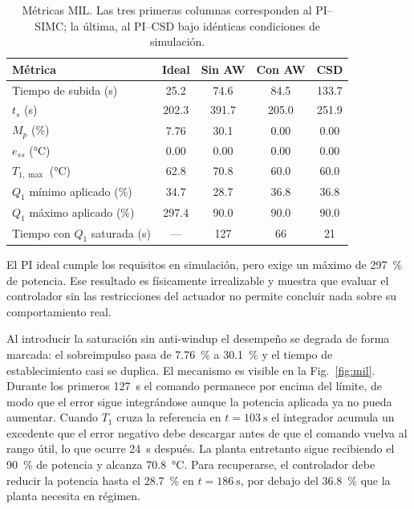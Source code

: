 \documentclass[conference,a4paper,10pt]{IEEEtran}
\begin{document}
\begin{table}[!t]
\caption{Métricas MIL. Las tres primeras columnas corresponden al PI--SIMC; la última, al PI--CSD
bajo idénticas condiciones de simulación.}
\label{tab:mil}
\centering
\footnotesize
\begin{tabular}{@{}lS[table-format=3.1]S[table-format=3.1]S[table-format=3.1]S[table-format=3.1]@{}}
\toprule
\textbf{Métrica} & {\textbf{Ideal}} & {\textbf{Sin AW}} & {\textbf{Con AW}} & {\textbf{CSD}} \\
\midrule
Tiempo de subida (\si{\second})        & 25.2  & 74.6  & 84.5  & 133.7 \\
$t_s$ (\si{\second})                   & 202.3 & 391.7 & 205.0 & 251.9 \\
$M_p$ (\si{\percent})                  & 7.76  & 30.1  & 0.00  & 0.00 \\
$e_{ss}$ (\si{\celsius})               & 0.00  & 0.00  & 0.00  & 0.00 \\
$T_{1,\max}$ (\si{\celsius})           & 62.8  & 70.8  & 60.0  & 60.0 \\
$Q_1$ mínimo aplicado (\si{\percent})  & 34.7  & 28.7  & 36.8  & 36.8 \\
$Q_1$ máximo aplicado (\si{\percent})  & 297.4 & 90.0  & 90.0  & 90.0  \\
Tiempo con $Q_1$ saturada (\si{\second}) & {---} & 127   & 66    & 21 \\
\bottomrule
\end{tabular}
\end{table}

El PI ideal cumple los requisitos en simulación, pero exige un máximo de \SI{297}{\percent} de
potencia. Ese resultado es físicamente irrealizable y muestra que evaluar el controlador sin las
restricciones del actuador no permite concluir nada sobre su comportamiento real.

Al introducir la saturación sin anti-windup el desempeño se degrada de forma marcada: el
sobreimpulso pasa de \SI{7.76}{\percent} a \SI{30.1}{\percent} y el tiempo de establecimiento casi
se duplica. El mecanismo es visible en la Fig.~\ref{fig:mil}. Durante los primeros
\SI{127}{\second} el comando permanece por encima del límite, de modo que el error sigue
integrándose aunque la potencia aplicada ya no pueda aumentar. Cuando $T_1$ cruza la referencia en
$t = \SI{103}{\second}$ el integrador acumula un excedente que el error negativo debe descargar
antes de que el comando vuelva al rango útil, lo que ocurre \SI{24}{\second} después. La planta
entretanto sigue recibiendo el \SI{90}{\percent} de potencia y alcanza \SI{70.8}{\celsius}. Para
recuperarse, el controlador debe reducir la potencia hasta el \SI{28.7}{\percent} en
$t = \SI{186}{\second}$, por debajo del \SI{36.8}{\percent} que la planta necesita en régimen.
\end{document}
